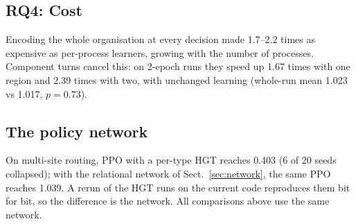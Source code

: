 \subsection{RQ4: Cost}
Encoding the whole organisation at every decision made \nfgae{} 1.7--2.2 times as
expensive as per-process learners, growing with the number of processes. Component turns
cancel this: on 2-epoch runs they speed \nfgae{} up 1.67 times with one region and 2.39
times with two, with unchanged learning (whole-run mean 1.023 vs 1.017, $p=0.73$).

\subsection{The policy network}
On multi-site routing, PPO with a per-type HGT reaches 0.403 (6 of 20 seeds collapsed);
with the relational network of Sect.~\ref{sec:network}, the same PPO reaches 1.039. A
rerun of the HGT runs on the current code reproduces them bit for bit, so the difference
is the network. All comparisons above use the same network.
